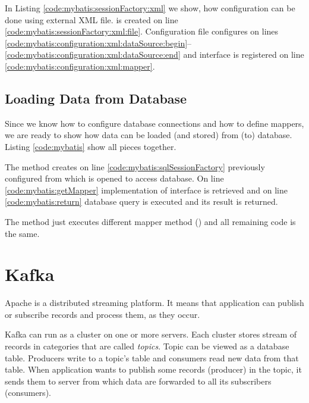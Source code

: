 
In Listing \ref{code:mybatis:sessionFactory:xml} we show, how configuration can be
done using external XML file.  is created
on line \ref{code:mybatis:sessionFactory:xml:file}. Configuration file
configures  on lines
\ref{code:mybatis:configuration:xml:dataSource:begin}--\ref{code:mybatis:configuration:xml:dataSource:end}
and  interface is registered on line \ref{code:mybatis:configuration:xml:mapper}.





\subsection{Loading Data from Database \label{frameworks:myBatis:run}}

Since we know how to configure database connections and how to define mappers,
we are ready to show how data can be loaded (and stored) from (to) database.
Listing \ref{code:mybatis} show all pieces together.

The  method creates on line \ref{code:mybatis:sqlSessionFactory}
previously configured  from which  is opened to
access database. On line \ref{code:mybatis:getMapper} implementation
of  interface is retrieved and on line \ref{code:mybatis:return}
database query is executed and its result is returned.

The  method just executes different mapper method ()
and all remaining code is the same.




\section{Kafka \label{frameworks:kafka}}

Apache \citet{Kafka} is a distributed streaming platform.
It means that application can publish or subscribe records and
process them, as they occur.

Kafka can run as a cluster on one or more servers.
Each cluster stores stream of records in categories that are called \textit{topics}.
Topic can be viewed as a database table. Producers write to a topic's table
and consumers read new data from that table.
When application wants to publish some records (producer) in the topic,
it sends them to server from which data are forwarded to all its subscribers (consumers).

